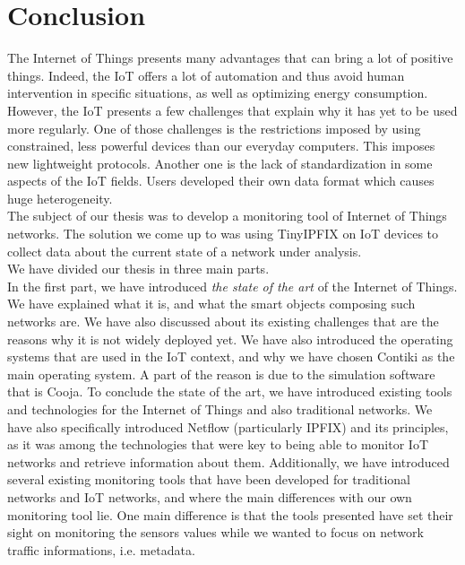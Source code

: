 \chapter*{Conclusion}

The Internet of Things presents many advantages that can bring a lot of positive things. Indeed, the IoT offers a lot of automation and thus avoid human intervention in specific situations, as well as optimizing energy consumption. However, the IoT presents a few challenges that explain why it has yet to be used more regularly. One of those challenges is the restrictions imposed by using constrained, less powerful devices than our everyday computers. This imposes new lightweight protocols. Another one is the lack of standardization in some aspects of the IoT fields. Users developed their own data format which causes huge heterogeneity.\\

The subject of our thesis was to develop a monitoring tool of Internet of Things networks. The solution we come up to was using TinyIPFIX on IoT devices to collect data about the current state of a network under analysis.\\

We have divided our thesis in three main parts.\\

In the first part, we have introduced \textit{the state of the art} of the Internet of Things. We have explained what it is, and what the smart objects composing such networks are. We have also discussed about its existing challenges that are the reasons why it is not widely deployed yet. We have also introduced the operating systems that are used in the IoT context, and why we have chosen Contiki as the main operating system. A part of the reason is due to the simulation software that is Cooja. To conclude the state of the art, we have introduced existing tools and technologies for the Internet of Things and also traditional networks. We have also specifically introduced Netflow (particularly IPFIX) and its principles, as it was among the technologies that were key to being able to monitor IoT networks and retrieve information about them. Additionally, we have introduced several existing monitoring tools that have been developed for traditional networks and IoT networks, and where the main differences with our own monitoring tool lie. One main difference is that the tools presented have set their sight on monitoring the sensors values while we wanted to focus on network traffic informations, i.e. metadata.\\

